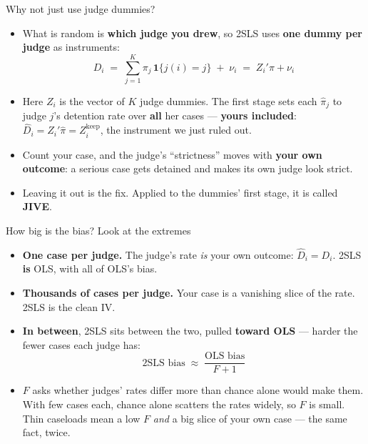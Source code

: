 \documentclass[
  11pt,
  ignorenonframetext,
  aspectratio=169,
]{beamer}
\providecommand{\tightlist}{%
  \setlength{\itemsep}{0pt}\setlength{\parskip}{0pt}}
\begin{document}
\begin{frame}{Why not just use judge dummies?}
\protect{}\label{why-not-just-use-judge-dummies}
\begin{itemize}
\tightlist
\item
  What is random is \textbf{which judge you drew}, so 2SLS uses
  \textbf{one dummy per judge} as instruments: \[
  D_i \;=\; \sum_{j=1}^{K} \pi_j\,\mathbf{1}\{j(i) = j\} \;+\; \nu_i \;=\; Z_i'\pi + \nu_i
  \]
\item
  Here \(Z_i\) is the vector of \(K\) judge dummies. The first stage
  sets each \(\hat\pi_j\) to judge \(j\)'s detention rate over
  \textbf{all} her cases --- \textbf{yours included}:
  \(\hat D_i = Z_i'\hat\pi = Z_i^{\text{keep}}\), the instrument we just
  ruled out.
\item
  Count your case, and the judge's ``strictness'' moves with
  \textbf{your own outcome}: a serious case gets detained and makes its
  own judge look strict.
\item
  Leaving it out is the fix. Applied to the dummies' first stage, it is
  called \textbf{JIVE}.
\end{itemize}
\end{frame}

\begin{frame}{How big is the bias? Look at the extremes}
\protect{}\label{how-big-is-the-bias-look-at-the-extremes}
\begin{itemize}
\tightlist
\item
  \textbf{One case per judge.} The judge's rate \emph{is} your own
  outcome: \(\hat D_i = D_i\). 2SLS \textbf{is} OLS, with all of OLS's
  bias.
\item
  \textbf{Thousands of cases per judge.} Your case is a vanishing slice
  of the rate. 2SLS is the clean IV.
\item
  \textbf{In between}, 2SLS sits between the two, pulled \textbf{toward
  OLS} --- harder the fewer cases each judge has: \[
  \text{2SLS bias} \;\approx\; \frac{\text{OLS bias}}{F+1}
  \]
\item
  \(F\) asks whether judges' rates differ more than chance alone would
  make them. With few cases each, chance alone scatters the rates
  widely, so \(F\) is small. Thin caseloads mean a low \(F\) \emph{and}
  a big slice of your own case --- the same fact, twice.
\end{itemize}
\end{frame}
\end{document}
